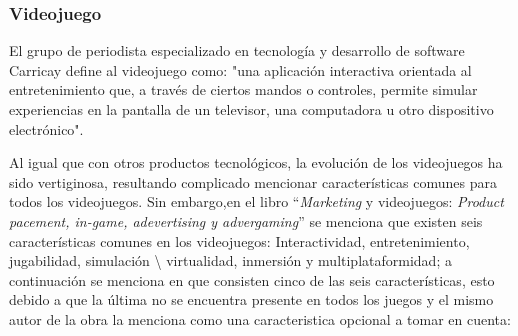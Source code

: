 \subsubsection{Videojuego}
El grupo de periodista especializado en tecnología y desarrollo de software 
Carricay define al videojuego como: "una aplicación interactiva orientada 
al entretenimiento que, a través de ciertos mandos o controles, permite simular 
experiencias en la pantalla de un televisor, una computadora u otro dispositivo 
electrónico"\cite{Ref_DefVideo}.
\\
\par
Al igual que con otros productos tecnológicos, la evolución de los videojuegos 
ha sido vertiginosa, resultando complicado mencionar características comunes 
para todos los videojuegos. Sin embargo,en el libro “\textit{Marketing} y videojuegos: 
\textit{Product pacement, in-game, adevertising y 
advergaming}” se menciona que existen seis características comunes en los 
videojuegos: Interactividad, entretenimiento, jugabilidad, simulación \textbackslash 
virtualidad, inmersión y multiplataformidad\cite{RefCarac}; a continuación se 
menciona en que consisten cinco de las seis características, esto debido a que 
la última no se encuentra presente en todos los juegos y el mismo autor de la 
obra la menciona como una caracteristica opcional a tomar en cuenta:

